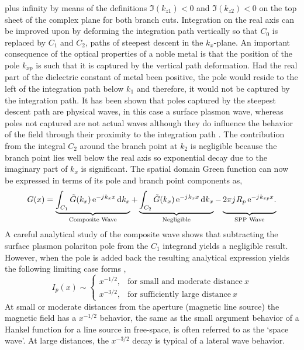 %
plus infinity by means of the definitions $\Im (k_{z1}) < 0$ and $\Im (k_{z2}) < 0$ on the top sheet of the complex plane for both branch cuts. Integration on the real axis can be improved upon by deforming the integration path vertically so that $C_0$ is replaced by $C_1$ and $C_2$, paths of steepest descent in the  $k_x$-plane. An important consequence of the optical properties of a noble metal is that the position of the pole $k_{xp}$ is such that it is captured by the vertical path deformation. Had the real part of the dielectric constant of metal been positive, the pole would reside to the left of the integration path below $k_1$ and therefore, it would not be captured by the integration path. It has been shown that poles captured by the steepest descent path are physical waves, in this case a surface plasmon wave, whereas poles not captured are not actual waves although they do influence the behavior of the field through their proximity to the integration path \cite{Collin2004}. The contribution from the
integral $C_2$ around the branch point at $k_2$ is negligible because the branch point lies well below the real axis so exponential decay due to the imaginary part of $k_x$ is significant. The spatial domain Green function can now be expressed in terms of its pole and branch point components as,
%
\begin{equation}
  G(x) = \underbrace {\int_{C_1} \ti G(k_x) \, \e^{-\j k_x x}\diff{k_x}}_{\text{Composite Wave}} +
  \underbrace{\vphantom{\int_{C_1} \ti G(k_x) \, \e^{-\j k_x x} \diff{k_x}} { \int_{C_2} \ti G(k_x) \, \e^{ - \j k_x x} \diff{k_x}}}_{\text{Negligible}} -
  \underbrace{
  \vphantom{\int_{C_1} \ti G(k_x) \, \e^{-\j k_x x} \diff{k_x}} {2\pi \j R_p}
  \, \e^{ -\j k_{xp} x}.}_{\text{SPP Wave}}
  \label{eq:GF_breakup}
\end{equation}
%
A careful analytical study of the composite wave shows that subtracting the surface plasmon polariton pole from the $C_1$ integrand yields a negligible result. However, when the pole is added back the resulting analytical expression yields the following limiting case forms \cite{Nevels2014},
%
\begin{equation}
  I_p(x) \sim
  \begin{cases}
    x^{-1/2}, & \text{for small and moderate distance}\ x \\
    x^{-3/2}, & \text{for sufficiently large distance}\ x
  \end{cases}
  \label{eq:spp_range}
\end{equation}
%
At small or moderate distances from the aperture (magnetic line source) the magnetic field has a $x^{-1/2}$ behavior, the same as the small argument behavior of a Hankel function for a line source in free-space, is often referred to as the  `space wave'. At large distances, the $x^{-3/2}$ decay is typical of a lateral wave behavior.

